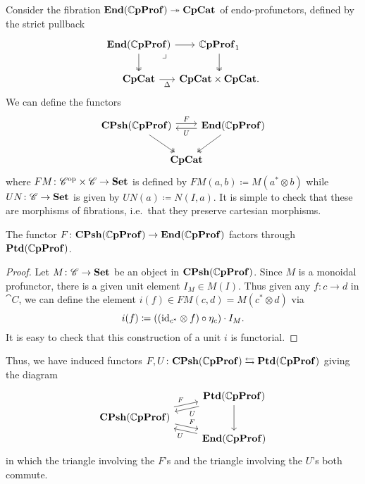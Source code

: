 \documentclass[11pt,oneside,article]{memoir}
\begin{document}
Consider the fibration $\mathbf{End}(\mathbb{C}\mathbf{pProf})\twoheadrightarrow\mathbf{CpCat}$ of endo-profunctors, defined by the strict pullback
\[ \begin{tikzcd}[column sep=0em]
   \End(\dCompProf) \ar[d,two heads] \ar[r] \ar[dr,phantom,"\lrcorner" very near start]
      & \dCompProf_1 \ar[d,two heads] \\
   \CompCat \ar[r,"\Delta"']
      & \CompCat\times\CompCat.
\end{tikzcd} \]
We can define the functors
\begin{equation} \begin{tikzcd}[column sep=-1em]
   \label{eqn:functors_1C_CC}
   \CPsh(\dCompProf) \ar[rr,shift left,"F"] \ar[dr,two heads]
   && \End(\dCompProf) \ar[ll,shift left,"U"] \ar[dl,two heads] \\
   & \CompCat &
\end{tikzcd} \end{equation}
where $FM\colon{\mathscr{C}}^{\text{op}}\times \mathscr{C}\to\mathbf{Set}$ is defined by $FM(a,b)\coloneqq M(a^*\otimes b)$ while $UN\colon \mathscr{C}\to\mathbf{Set}$ is given by $UN(a)\coloneqq N(I,a)$. It is simple to check that these are morphisms of fibrations, i.e.\ that they preserve cartesian morphisms.

\begin{proposition}
      \label{Prop:canonical unit}
   The functor $F\colon\mathbf{CPsh}(\mathbb{C}\mathbf{pProf})\to\mathbf{End}(\mathbb{C}\mathbf{pProf})$ factors through $\mathbf{Ptd}(\mathbb{C}\mathbf{pProf})$.
\end{proposition}
\begin{proof}
   Let $M\colon \mathscr{C}\to\mathbf{Set}$ be an object in $\mathbf{CPsh}(\mathbb{C}\mathbf{pProf})$. Since $M$ is a monoidal profunctor, there is a given unit element $I_M\in M(I)$. Thus given any $f\colon c\to d$ in $ \cat{C}$, we can define the element $i(f)\in FM(c,d)=M(c^*\otimes d)$ via
   \[i(f)\coloneqq((\mathrm{id}_{c^*}\otimes f)\circ\eta_c)\cdot I_M.\]
   It is easy to check that this construction of a unit $i$ is functorial.
\end{proof}

Thus, we have induced functors $F,U\colon\mathbf{CPsh}(\mathbb{C}\mathbf{pProf})\leftrightarrows\mathbf{Ptd}(\mathbb{C}\mathbf{pProf})$ giving the diagram
\begin{equation} \begin{tikzcd}[row sep=tiny]
      \label{eqn:ptd_functors_1C_CC}
   & \Ptd(\dCompProf) \ar[dd] \ar[dl,shift left,"U"] \\
   \CPsh(\dCompProf) \ar[ur,shift left,"F"] \ar[dr,shift left,"F"] & \\
   & \End(\dCompProf) \ar[ul,shift left,"U"]
\end{tikzcd} \end{equation}
in which the triangle involving the $F$'s and the triangle involving the $U$'s both commute.
\end{document}
